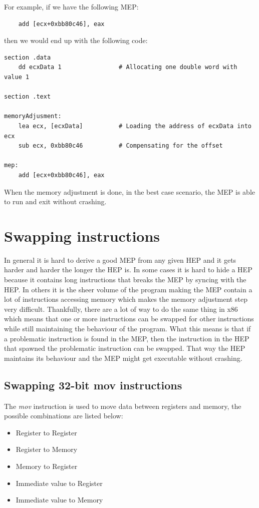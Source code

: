 \documentclass[11pt,twoside]{eitExjobb}
\begin{document}
\noindent For example, if we have the following MEP:
\begin{verbatim}
    add [ecx+0xbb80c46], eax
\end{verbatim}  

\noindent then we would end up with the following code:
\begin{verbatim}
section .data
    dd ecxData 1 				# Allocating one double word with value 1 

section .text

memoryAdjusment:
    lea ecx, [ecxData]			# Loading the address of ecxData into ecx
    sub ecx, 0xbb80c46			# Compensating for the offset

mep:
    add [ecx+0xbb80c46], eax
\end{verbatim}

\noindent When the memory adjustment is done, in the best case scenario, the MEP is able to run and exit without crashing.

\section{Swapping instructions}
In general it is hard to derive a good MEP from any given HEP and it gets harder and harder the longer the HEP is. In some cases it is hard to hide a HEP because it contains long instructions that breaks the MEP by syncing with the HEP. In others it is the sheer volume of the program making the MEP contain a lot of instructions accessing memory which makes the memory adjustment step very difficult. Thankfully, there are a lot of way to do the same thing in x86 which means that one or more instructions can be swapped for other instructions while still maintaining the behaviour of the program. What this means is that if a problematic instruction is found in the MEP, then the instruction in the HEP that spawned the problematic instruction can be swapped. That way the HEP maintains its behaviour and the MEP might get executable without crashing.

\subsection{Swapping 32-bit mov instructions}
The \emph{mov} instruction is used to move data between registers and memory, the possible combinations are listed below:
\begin{itemize}
\item{Register to Register}
\item{Register to Memory}
\item{Memory to Register}
\item{Immediate value to Register}
\item{Immediate value to Memory}
\end{itemize}
\end{document}
